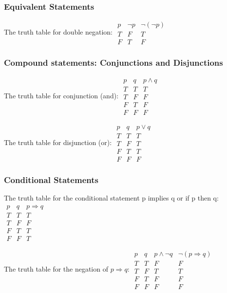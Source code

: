\subsubsection*{Equivalent Statements}
\par\noindent The truth table for double negation: $\begin{array}{c||c|c}p & \neg{}p & \neg{}(\neg{}p) \\ \hline T & F & T \\ F & T & F\end{array}$
\subsubsection*{Compound statements: Conjunctions and Disjunctions}
\par\noindent The truth table for conjunction (and): $\begin{array}{c|c||c} p & q & p\land{}q \\ \hline T & T & T \\ T & F & F \\ F & T & F \\ F & F& F\end{array}$
\par\noindent The truth table for disjunction (or): $\begin{array}{c|c||c}p & q & p\lor{}q \\ \hline T & T & T \\ T & F & T \\ F & T & T \\ F & F & F\end{array}$
\subsubsection*{Conditional Statements}
\par\noindent The truth table for the conditional statement p implies q or if p then q: $\begin{array}{c|c||c}p & q & p\Rightarrow{}q \\ \hline T & T & T \\ T & F & F \\ F & T & T \\ F & F & T\end{array}$
\par\noindent The truth table for the negation of $p\Rightarrow{}q$: $\begin{array}{c|c||c|c}p & q & p\land\neg{}q & \neg{}(p\Rightarrow{}q) \\ \hline T & T & F & F \\ T & F & T & T \\ F & T & F & F \\ F & F & F & F\end{array}$
